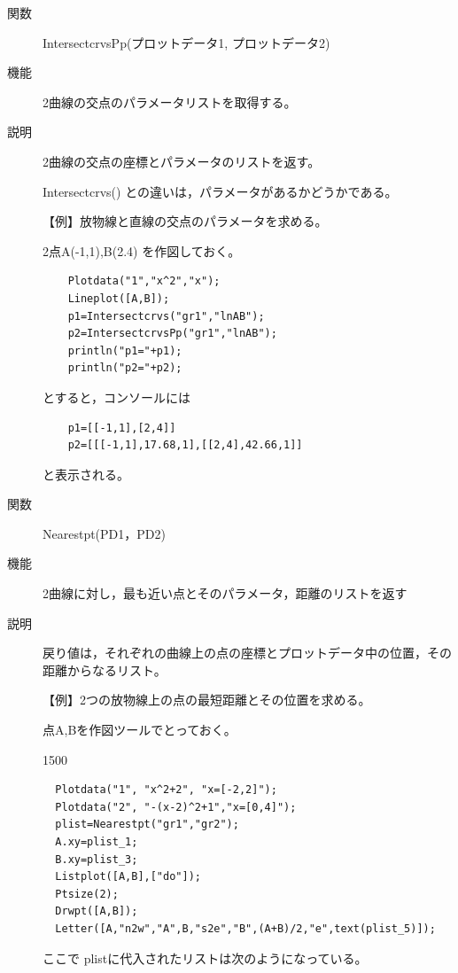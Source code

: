 \documentclass[papersize,a4paper,12pt,uplatex]{jsarticle}
\begin{document}
\begin{description}
\vspace{\baselineskip}
\hypertarget{intersectcrvspp}{}
\item[関数]  IntersectcrvsPp(プロットデータ1, プロットデータ2)
\item[機能]  2曲線の交点のパラメータリストを取得する。
\item[説明]  2曲線の交点の座標とパラメータのリストを返す。

Intersectcrvs() との違いは，パラメータがあるかどうかである。

\vspace{\baselineskip}
【例】放物線と直線の交点のパラメータを求める。

2点A(-1,1),B(2.4) を作図しておく。
\begin{verbatim}
    Plotdata("1","x^2","x");
    Lineplot([A,B]);
    p1=Intersectcrvs("gr1","lnAB");
    p2=IntersectcrvsPp("gr1","lnAB");
    println("p1="+p1);
    println("p2="+p2);
\end{verbatim}
とすると，コンソールには
\begin{verbatim}
    p1=[[-1,1],[2,4]] 
    p2=[[[-1,1],17.68,1],[[2,4],42.66,1]]
\end{verbatim}
と表示される。

\vspace{\baselineskip}
\hypertarget{nearestpt}{}
\item[関数]  Nearestpt(PD1，PD2)
\item[機能]  2曲線に対し，最も近い点とそのパラメータ，距離のリストを返す
\item[説明]  戻り値は，それぞれの曲線上の点の座標とプロットデータ中の位置，その距離からなるリスト。

\vspace{\baselineskip}
【例】2つの放物線上の点の最短距離とその位置を求める。

点A,Bを作図ツールでとっておく。

\begin{layer}{150}{0}
\end{layer}

\begin{verbatim}
  Plotdata("1", "x^2+2", "x=[-2,2]");
  Plotdata("2", "-(x-2)^2+1","x=[0,4]");
  plist=Nearestpt("gr1","gr2");
  A.xy=plist_1;
  B.xy=plist_3;
  Listplot([A,B],["do"]);
  Ptsize(2);
  Drwpt([A,B]);
  Letter([A,"n2w","A",B,"s2e","B",(A+B)/2,"e",text(plist_5)]);
\end{verbatim}

ここで plistに代入されたリストは次のようになっている。


\end{description}
\end{document}
